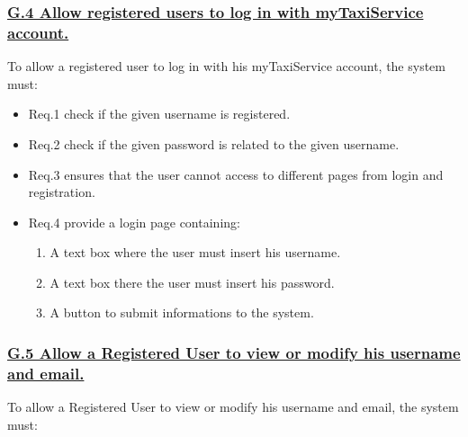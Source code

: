 \documentclass{report}
\begin{document}
			\subsubsection{\lbrack \hyperref[sec:g4]{G.4 Allow registered users to log in with myTaxiService account.}\rbrack}
			To allow a registered user to log in with his myTaxiService account, the system must:

				\begin{itemize}
					\item \lbrack Req.1\rbrack \label{sec:fr1_g4} check if the given username is registered.
					\item \lbrack Req.2\rbrack \label{sec:fr2_g4} check if the given password is related to the given username.
					\item \lbrack Req.3\rbrack \label{sec:fr3_g4} ensures that the user cannot access to different pages from login and registration.
					\item \lbrack Req.4\rbrack \label{sec:fr4_g4} provide a login page containing:
						\begin{enumerate}
							\item A text box where the user must insert his username.
							\item A text box there the user must insert his password.
							\item A button to submit informations to the system.
						\end{enumerate}
				\end{itemize}

			\subsubsection{\lbrack \hyperref[sec:g5]{G.5 Allow a Registered User to view or modify his username and email.}\rbrack}
			To allow a Registered User to view or modify his username and email, the system must:
\end{document}
